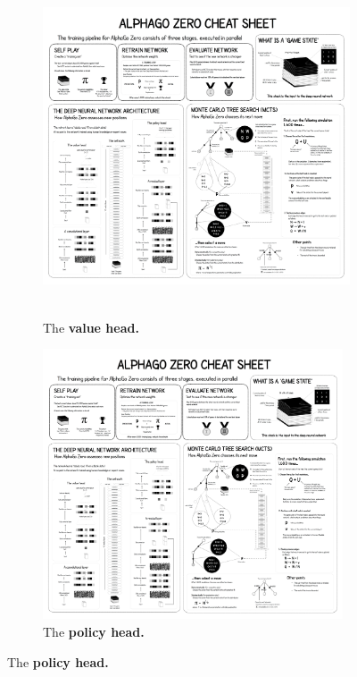 \documentclass{article}
\begin{document}
\begin{figure}[H]
\begin{subfigure}{0.5\textwidth}
		\includegraphics[height=10cm,trim={380px 1665px 6840px 3798px},clip]{alpha_go_zero_cheat_sheet.png}
		\caption{The \textbf{value head.}}
		\label{fig:arch_value}
	\end{subfigure}
	\hfill
	\begin{subfigure}{0.5\textwidth}
		\centering
		\includegraphics[height=8cm,trim={2567px 2995px 4688px 3197px},clip]{alpha_go_zero_cheat_sheet.png}
	\caption{The \textbf{policy head.}}
	\label{fig:arch_policy}
	\end{subfigure}
\end{figure}
\end{document}

